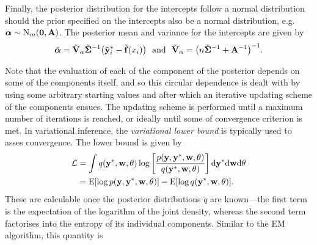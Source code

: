Finally, the posterior distribution for the intercepts follow a normal distribution should the prior specified on the intercepts also be a normal distribution, e.g. ${\bm\alpha} \sim \operatorname{N}_m({\mathbf 0},{\mathbf A})$.
The posterior mean and variance for the intercepts are given by
\[
  \tilde{{\bm\alpha}} = \tilde{{\mathbf V}}_\alpha \tilde{{\bm\Sigma}}^{-1}\big(\tilde{{\mathbf y}}_i^* - \tilde{{\mathbf f}}(x_i)\big) \ \text{ and } \ \tilde{{\mathbf V}}_\alpha = \big(n\tilde{{\bm\Sigma}}^{-1} + {\mathbf A}^{-1}\big)^{-1}.
\]

Note that the evaluation of each of the component of the posterior depends on some of the components itself, and so this circular dependence is dealt with by using some arbitrary starting values and after which an iterative updating scheme of the components ensues.
The updating scheme is performed until a maximum number of iterations is reached, or ideally until some of convergence criterion is met.
In variational inference, the \emph{variational lower bound} is typically used to asses convergence.
The lower bound is given by
\begin{align*}
  {\mathcal L} 
  &= \int q({\mathbf y}^*,{\mathbf w},\theta) \log \left[ \frac{p({\mathbf y},{\mathbf y}^*,{\mathbf w},\theta)}{q({\mathbf y}^*,{\mathbf w},\theta)} \right] \text{d}{\mathbf y}^* \text{d}{\mathbf w} \text{d}\theta \\
  &= \operatorname{E}[\log p({\mathbf y},{\mathbf y}^*,{\mathbf w},\theta)] - \operatorname{E}[\log q({\mathbf y}^*,{\mathbf w},\theta)].
\end{align*}
These are calculable once the posterior distributions $\tilde q$ are known---the first term is the expectation of the logarithm of the joint density, whereas the second term factorises into the entropy of its individual components.
Similar to the EM algorithm, this quantity is


